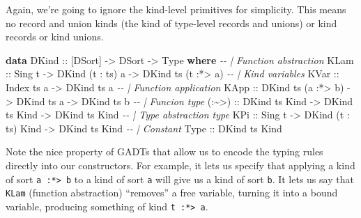 \documentclass[]{article}
\newenvironment{Shaded}{}{}
\newcommand{\CommentTok}[1]{\textcolor[rgb]{0.38,0.63,0.69}{\textit{#1}}}
\newcommand{\DataTypeTok}[1]{\textcolor[rgb]{0.56,0.13,0.00}{#1}}
\newcommand{\KeywordTok}[1]{\textcolor[rgb]{0.00,0.44,0.13}{\textbf{#1}}}
\newcommand{\NormalTok}[1]{#1}
\newcommand{\OperatorTok}[1]{\textcolor[rgb]{0.40,0.40,0.40}{#1}}
\newcommand{\OtherTok}[1]{\textcolor[rgb]{0.00,0.44,0.13}{#1}}
\begin{document}
Again, we're going to ignore the kind-level primitives for simplicity. This
means no record and union kinds (the kind of type-level records and unions) or
kind records or kind unions.

\begin{Shaded}
\begin{Highlighting}[]
\KeywordTok{data} \DataTypeTok{DKind}\OtherTok{ ::}\NormalTok{ [}\DataTypeTok{DSort}\NormalTok{] }\OtherTok{{-}>} \DataTypeTok{DSort} \OtherTok{{-}>} \DataTypeTok{Type} \KeywordTok{where}
    \CommentTok{{-}{-} | Function abstraction}
    \DataTypeTok{KLam}\OtherTok{  ::} \DataTypeTok{Sing}\NormalTok{ t }\OtherTok{{-}>} \DataTypeTok{DKind}\NormalTok{ (t \textquotesingle{}}\OperatorTok{:}\NormalTok{ ts) a }\OtherTok{{-}>} \DataTypeTok{DKind}\NormalTok{ ts (t \textquotesingle{}}\OperatorTok{:*>}\NormalTok{ a)}
    \CommentTok{{-}{-} | Kind variables}
    \DataTypeTok{KVar}\OtherTok{  ::} \DataTypeTok{Index}\NormalTok{ ts a }\OtherTok{{-}>} \DataTypeTok{DKind}\NormalTok{ ts a}
    \CommentTok{{-}{-} | Function application}
    \DataTypeTok{KApp}\OtherTok{  ::} \DataTypeTok{DKind}\NormalTok{ ts (a \textquotesingle{}}\OperatorTok{:*>}\NormalTok{ b) }\OtherTok{{-}>} \DataTypeTok{DKind}\NormalTok{ ts a }\OtherTok{{-}>} \DataTypeTok{DKind}\NormalTok{ ts b}
    \CommentTok{{-}{-} | Funcion type}
\OtherTok{    (:\textasciitilde{}>) ::} \DataTypeTok{DKind}\NormalTok{ ts }\DataTypeTok{\textquotesingle{}Kind} \OtherTok{{-}>} \DataTypeTok{DKind}\NormalTok{ ts }\DataTypeTok{\textquotesingle{}Kind} \OtherTok{{-}>} \DataTypeTok{DKind}\NormalTok{ ts }\DataTypeTok{\textquotesingle{}Kind}
    \CommentTok{{-}{-} | Type abstraction type}
    \DataTypeTok{KPi}\OtherTok{   ::} \DataTypeTok{Sing}\NormalTok{ t }\OtherTok{{-}>} \DataTypeTok{DKind}\NormalTok{ (t \textquotesingle{}}\OperatorTok{:}\NormalTok{ ts) }\DataTypeTok{\textquotesingle{}Kind} \OtherTok{{-}>} \DataTypeTok{DKind}\NormalTok{ ts }\DataTypeTok{\textquotesingle{}Kind}
    \CommentTok{{-}{-} | Constant}
    \DataTypeTok{Type}\OtherTok{  ::} \DataTypeTok{DKind}\NormalTok{ ts }\DataTypeTok{\textquotesingle{}Kind}
\end{Highlighting}
\end{Shaded}

Note the nice property of GADTs that allow us to encode the typing rules
directly into our constructors. For example, it lets us specify that applying a
kind of sort \texttt{a\ :*\textgreater{}\ b} to a kind of sort \texttt{a} will
give us a kind of sort \texttt{b}. It lets us say that \texttt{KLam} (function
abstraction) ``removes'' a free variable, turning it into a bound variable,
producing something of kind \texttt{t\ :*\textgreater{}\ a}.
\end{document}
